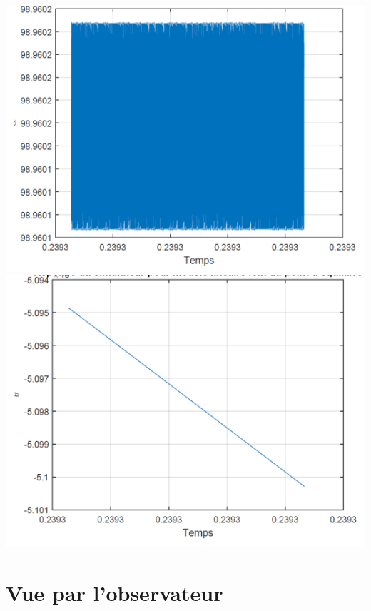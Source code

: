 \documentclass[12pt, a4paper, openany]{report}
\begin{document}
\begin{center}
{\includegraphics[scale=0.6]{fig8.png}} 
\label{fiig8}
\quad
{\includegraphics[scale=0.6]{fig9.png}} 
\label{fiig9}
\end{center}


    \section{Vue par l'observateur}
\end{document}
